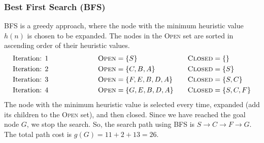 \documentclass[12pt]{article}
\begin{document}
    \subsubsection*{Best First Search (BFS)}
    BFS is a greedy approach, where the node with the minimum heuristic value $h(n)$ is chosen
    to be expanded. The nodes in the \textsc{Open} set are sorted in ascending order of their
    heuristic values.
    \begin{align*}
        \text{Iteration: 1} \hspace*{70pt} &\textsc{Open} = \{ S \} &\quad \textsc{Closed} &= \{ \} \\
        \text{Iteration: 2} \hspace*{70pt} &\textsc{Open} = \{ C, B, A \} &\quad \textsc{Closed} &= \{ S \} \\
        \text{Iteration: 3} \hspace*{70pt} &\textsc{Open} = \{ F, E, B, D, A \} &\quad \textsc{Closed} &= \{ S, C \} \\
        \text{Iteration: 4} \hspace*{70pt} &\textsc{Open} = \{ G, E, B, D, A \} &\quad \textsc{Closed} &= \{ S, C, F \}
    \end{align*}
    The node with the minimum heuristic value is selected every time, expanded (add its children
    to the \textsc{Open} set), and then closed. Since we have reached the goal node $G$, we stop
    the search. So, the search path using BFS is $S \rightarrow C \rightarrow F \rightarrow G$. The total
    path cost is $g(G) = 11 + 2 + 13 = 26$.
\end{document}
